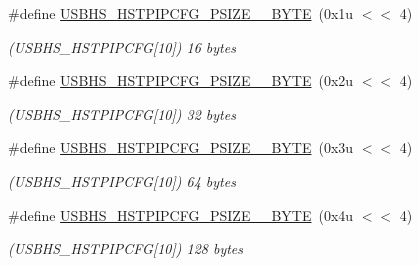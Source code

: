 \begin{DoxyCompactItemize}
\mbox{\label{group__SAME70__USBHS_gad29ee9956753a47492c14355735f54e0}} 
\#define \mbox{\hyperlink{group__SAME70__USBHS_gad29ee9956753a47492c14355735f54e0}{U\+S\+B\+H\+S\+\_\+\+H\+S\+T\+P\+I\+P\+C\+F\+G\+\_\+\+P\+S\+I\+Z\+E\+\_\+\_\+\+B\+Y\+TE}}~(0x1u $<$$<$ 4)
\begin{DoxyCompactList}\small\item\em (U\+S\+B\+H\+S\+\_\+\+H\+S\+T\+P\+I\+P\+C\+FG\mbox{[}10\mbox{]}) 16 bytes \end{DoxyCompactList}\item 
\mbox{\label{group__SAME70__USBHS_ga1eb09cbf11f9301e13a44c5f3d6f9c28}} 
\#define \mbox{\hyperlink{group__SAME70__USBHS_ga1eb09cbf11f9301e13a44c5f3d6f9c28}{U\+S\+B\+H\+S\+\_\+\+H\+S\+T\+P\+I\+P\+C\+F\+G\+\_\+\+P\+S\+I\+Z\+E\+\_\+\_\+\+B\+Y\+TE}}~(0x2u $<$$<$ 4)
\begin{DoxyCompactList}\small\item\em (U\+S\+B\+H\+S\+\_\+\+H\+S\+T\+P\+I\+P\+C\+FG\mbox{[}10\mbox{]}) 32 bytes \end{DoxyCompactList}\item 
\mbox{\label{group__SAME70__USBHS_ga6e25221de729be34f34dcb8b0dfe357c}} 
\#define \mbox{\hyperlink{group__SAME70__USBHS_ga6e25221de729be34f34dcb8b0dfe357c}{U\+S\+B\+H\+S\+\_\+\+H\+S\+T\+P\+I\+P\+C\+F\+G\+\_\+\+P\+S\+I\+Z\+E\+\_\+\_\+\+B\+Y\+TE}}~(0x3u $<$$<$ 4)
\begin{DoxyCompactList}\small\item\em (U\+S\+B\+H\+S\+\_\+\+H\+S\+T\+P\+I\+P\+C\+FG\mbox{[}10\mbox{]}) 64 bytes \end{DoxyCompactList}\item 
\mbox{\label{group__SAME70__USBHS_ga22bdb34d8abfe49e2495f03d6eab0334}} 
\#define \mbox{\hyperlink{group__SAME70__USBHS_ga22bdb34d8abfe49e2495f03d6eab0334}{U\+S\+B\+H\+S\+\_\+\+H\+S\+T\+P\+I\+P\+C\+F\+G\+\_\+\+P\+S\+I\+Z\+E\+\_\+\_\+\+B\+Y\+TE}}~(0x4u $<$$<$ 4)
\begin{DoxyCompactList}\small\item\em (U\+S\+B\+H\+S\+\_\+\+H\+S\+T\+P\+I\+P\+C\+FG\mbox{[}10\mbox{]}) 128 bytes \end{DoxyCompactList}\item 
\mbox{\label{group__SAME70__USBHS_ga8609c494ead12f66b21c1efb095173c5}} 

\end{DoxyCompactItemize}
